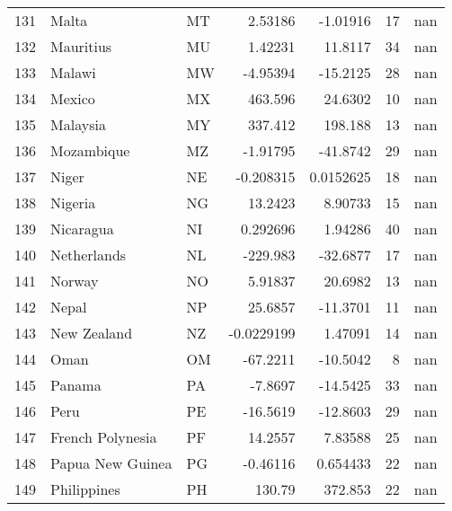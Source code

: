 \begin{tabular}{rllrrrr}
 131 & Malta                                          & MT         &    2.53186     &   -1.01916    &     17 &          nan \\
 132 & Mauritius                                      & MU         &    1.42231     &   11.8117     &     34 &          nan \\
 133 & Malawi                                         & MW         &   -4.95394     &  -15.2125     &     28 &          nan \\
 134 & Mexico                                         & MX         &  463.596       &   24.6302     &     10 &          nan \\
 135 & Malaysia                                       & MY         &  337.412       &  198.188      &     13 &          nan \\
 136 & Mozambique                                     & MZ         &   -1.91795     &  -41.8742     &     29 &          nan \\
 137 & Niger                                          & NE         &   -0.208315    &    0.0152625  &     18 &          nan \\
 138 & Nigeria                                        & NG         &   13.2423      &    8.90733    &     15 &          nan \\
 139 & Nicaragua                                      & NI         &    0.292696    &    1.94286    &     40 &          nan \\
 140 & Netherlands                                    & NL         & -229.983       &  -32.6877     &     17 &          nan \\
 141 & Norway                                         & NO         &    5.91837     &   20.6982     &     13 &          nan \\
 142 & Nepal                                          & NP         &   25.6857      &  -11.3701     &     11 &          nan \\
 143 & New Zealand                                    & NZ         &   -0.0229199   &    1.47091    &     14 &          nan \\
 144 & Oman                                           & OM         &  -67.2211      &  -10.5042     &      8 &          nan \\
 145 & Panama                                         & PA         &   -7.8697      &  -14.5425     &     33 &          nan \\
 146 & Peru                                           & PE         &  -16.5619      &  -12.8603     &     29 &          nan \\
 147 & French Polynesia                               & PF         &   14.2557      &    7.83588    &     25 &          nan \\
 148 & Papua New Guinea                               & PG         &   -0.46116     &    0.654433   &     22 &          nan \\
 149 & Philippines                                    & PH         &  130.79        &  372.853      &     22 &          nan \\
\hline
\end{tabular}